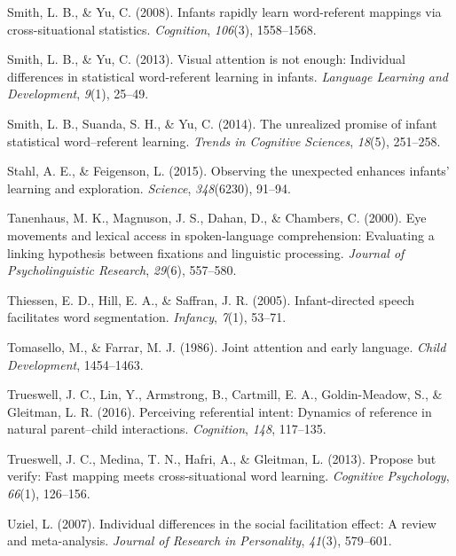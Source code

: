 \documentclass[oneside]{report}
\begin{document}
\hypertarget{ref-smith2008infants}{}
Smith, L. B., \& Yu, C. (2008). Infants rapidly learn word-referent
mappings via cross-situational statistics. \emph{Cognition},
\emph{106}(3), 1558--1568.

\hypertarget{ref-smith2013visual}{}
Smith, L. B., \& Yu, C. (2013). Visual attention is not enough:
Individual differences in statistical word-referent learning in infants.
\emph{Language Learning and Development}, \emph{9}(1), 25--49.

\hypertarget{ref-smith2014unrealized}{}
Smith, L. B., Suanda, S. H., \& Yu, C. (2014). The unrealized promise of
infant statistical word--referent learning. \emph{Trends in Cognitive
Sciences}, \emph{18}(5), 251--258.

\hypertarget{ref-stahl2015observing}{}
Stahl, A. E., \& Feigenson, L. (2015). Observing the unexpected enhances
infants' learning and exploration. \emph{Science}, \emph{348}(6230),
91--94.

\hypertarget{ref-tanenhaus2000eye}{}
Tanenhaus, M. K., Magnuson, J. S., Dahan, D., \& Chambers, C. (2000).
Eye movements and lexical access in spoken-language comprehension:
Evaluating a linking hypothesis between fixations and linguistic
processing. \emph{Journal of Psycholinguistic Research}, \emph{29}(6),
557--580.

\hypertarget{ref-thiessen2005infant}{}
Thiessen, E. D., Hill, E. A., \& Saffran, J. R. (2005). Infant-directed
speech facilitates word segmentation. \emph{Infancy}, \emph{7}(1),
53--71.

\hypertarget{ref-tomasello1986joint}{}
Tomasello, M., \& Farrar, M. J. (1986). Joint attention and early
language. \emph{Child Development}, 1454--1463.

\hypertarget{ref-trueswell2016perceiving}{}
Trueswell, J. C., Lin, Y., Armstrong, B., Cartmill, E. A.,
Goldin-Meadow, S., \& Gleitman, L. R. (2016). Perceiving referential
intent: Dynamics of reference in natural parent--child interactions.
\emph{Cognition}, \emph{148}, 117--135.

\hypertarget{ref-trueswell2013propose}{}
Trueswell, J. C., Medina, T. N., Hafri, A., \& Gleitman, L. (2013).
Propose but verify: Fast mapping meets cross-situational word learning.
\emph{Cognitive Psychology}, \emph{66}(1), 126--156.

\hypertarget{ref-uziel2007individual}{}
Uziel, L. (2007). Individual differences in the social facilitation
effect: A review and meta-analysis. \emph{Journal of Research in
Personality}, \emph{41}(3), 579--601.
\end{document}
